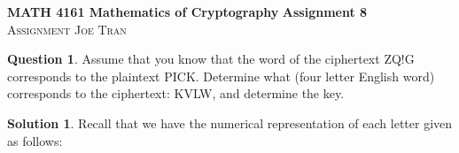 \documentclass[11pt]{article}
\theoremstyle{definition}\newtheorem{definition}{Definition}
\theoremstyle{definition}\newtheorem{question}{Question}
\theoremstyle{definition}\newtheorem*{solution}{Solution}
\theoremstyle{definition}\newtheorem{example}{Example}
\theoremstyle{definition}\newtheorem{notation}{Notation}
\theoremstyle{theorem}\newtheorem{theorem}{Theorem}
\theoremstyle{theorem}\newtheorem{corollary}{Corollary}
\theoremstyle{theorem}\newtheorem{lemma}{Lemma}
\theoremstyle{theorem}\newtheorem{proposition}{Proposition}
\begin{document}
\noindent \textbf{MATH 4161 Mathematics of Cryptography} \hfill \textbf{Assignment 8} \\
\textsc{Assignment} \hfill \textsc{Joe Tran}

\begin{question}
    Assume that you know that the word of the ciphertext \textsf{ZQ!G} corresponds to the plaintext \textsf{PICK}. Determine what (four letter English word) corresponds to the ciphertext: \textsf{KVLW}, and determine the key.
\end{question}

\begin{solution}
    Recall that we have the numerical representation of each letter given as follows:
    \begin{table}[h]
        \centering
    \end{table}
    

\end{solution}
\end{document}
